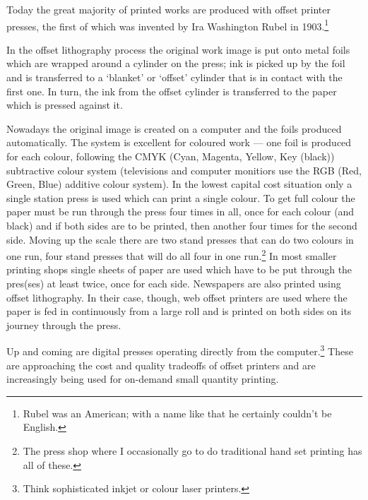 \documentclass[10pt,a4paper,extrafontsizes]{memoir}
\begin{document}
\begin{paracol}{2}
\switchEng
    Today the great majority of printed works are produced with 
offset printer presses, the first of which was
invented by Ira Washington Rubel in 
1903.\footnote{Rubel was an American; with a name like that he certainly
couldn't be English.}

    In the offset lithography process the original work image is put 
onto metal foils which 
are wrapped around a cylinder on the press; ink is picked up by the foil 
and is transferred to a `blanket' or `offset' cylinder that is in contact
with the first one. In turn, the ink from the offset cylinder is 
transferred to the paper which is pressed against it.

    Nowadays the original image is created on a computer and the foils
produced automatically. The system is excellent for coloured work --- one foil
is produced for each colour, following the CMYK
(Cyan, Magenta, Yellow, Key (black)) subtractive colour system 
(televisions and computer monitiors use the RGB (Red, Green, Blue) 
additive colour system). In the lowest capital cost situation only a
single station press is used which can print a single colour. To get full
colour the paper must be run through the press four times in all, once for
each colour (and black) and if both sides are to be printed, then another
four times for the second side. Moving up
the scale there are two stand presses that can do two colours in one run,
four stand presses that will do all four in one run.\footnote{The press shop
where I occasionally go to do traditional hand set printing has all of these.} 
In most
smaller printing shops single sheets of paper are used which have to be put 
through the pres(ses) at least twice, once for each side. Newspapers are
also printed using offset lithography. In their case, though, web offset
printers are used where the paper is fed in continuously from a large roll and
is printed on both sides on its journey through the press.

    Up and coming are digital presses operating directly from the 
computer.\footnote{Think sophisticated inkjet or colour laser printers.}
These are approaching the cost and quality tradeoffs of offset printers
and are increasingly being used for on-demand small quantity printing. 


\end{paracol}
\end{document}
